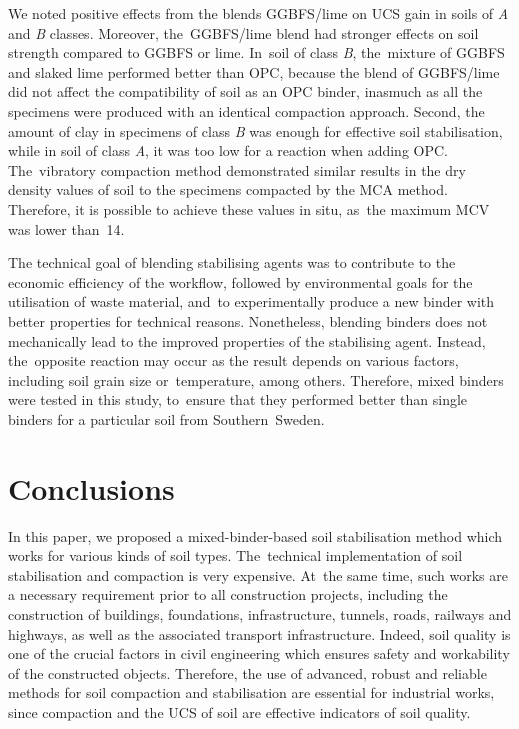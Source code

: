 \documentclass[electronics,article,accept,pdftex,moreauthors]{Definitions/mdpi}
\begin{document}
	We noted positive effects from the blends GGBFS/lime on UCS gain in soils {of} \emph{A} and \emph{B} classes. Moreover, the~GGBFS/lime {blend had stronger effects on soil strength} compared to{ }GGBFS or lime. In~soil {of class} \emph{B}, the~{mixture} of GGBFS and slaked lime {performed better than }OPC, {because the} blend of GGBFS/lime did not affect the compatibility of soil as {an} OPC binder, inasmuch as all the specimens were produced with an identical compaction approach. Second, {the amount of} clay in {specimens of class} \emph{B} was enough {for effective soil stabilisation}, while in soil {of class} \emph{A}, it was too low {for} a reaction{ }when adding OPC{. The~vibratory compaction method demonstrated} similar {results} in {the} dry density values of soil{ }to the specimens compacted by {the }MCA {method}. Therefore, it {is} possible to achieve these values {in situ}, as~the maximum MCV was lower than~14.
	
	The {technical goal} of blending stabilising agents {was to contribute to} the economic efficiency %
	of {the} workflow, followed by environmental goals for the utilisation of waste material, and~to experimentally produce a new binder with better properties for technical reasons. Nonetheless, blending binders does not mechanically lead to the improved properties of {the} stabilising agent. Instead, the~opposite reaction may occur as the result depends on various factors, including soil grain size or~temperature, among others. Therefore, mixed binders were tested in this study, to~ensure that they performed better than single binders for a particular soil from Southern~Sweden.

\section{Conclusions}

{In this paper, we proposed a mixed-binder-based soil stabilisation method which works for various kinds of soil types. The~}technical implementation of soil stabilisation and compaction is very expensive. At~the same time, such works are a{ necessary }requirement prior to all construction projects, including {the} construction of buildings, foundations, infrastructure, tunnels, roads, railways and highways, {as well as the} associated transport infrastructure. Indeed, soil quality is one of the crucial factors in civil engineering which ensures safety and workability of {the} constructed objects. Therefore, {the use of} advanced, robust {and} reliable methods for soil compaction and stabilisation are essential for industrial {works, since} compaction and the UCS {of soil} are {effective} indicators of soil quality{.}
\end{document}
